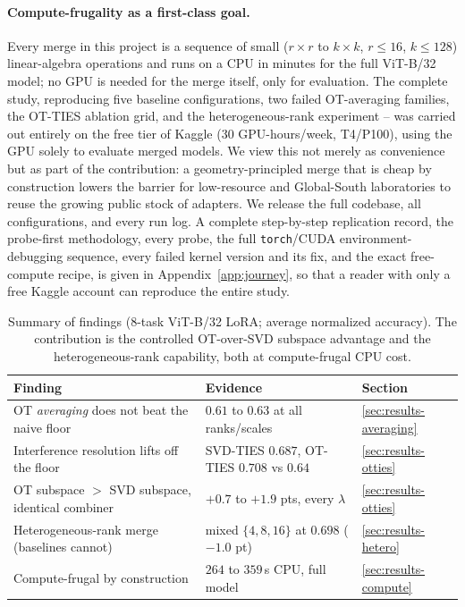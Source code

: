 \documentclass[11pt]{article}
\newcommand{\otties}{\textsc{OT-TIES}}
\newcommand{\svdties}{\textsc{SVD-TIES}}
\begin{document}
\paragraph{Compute-frugality as a first-class goal.}
Every merge in this project is a sequence of small ($r\times r$ to $k\times k$, $r\le 16$, $k\le 128$)
linear-algebra operations and runs on a CPU in minutes for the full ViT-B/32 model; no GPU is needed for
the merge itself, only for evaluation. The complete study, reproducing five baseline configurations,
two failed OT-averaging families, the \otties{} ablation grid, and the heterogeneous-rank experiment --
was carried out entirely on the free tier of Kaggle (30 GPU-hours/week, T4/P100), using the GPU solely to
evaluate merged models. We view this not merely as convenience but as part of the contribution: a
geometry-principled merge that is cheap by construction lowers the barrier for low-resource and
Global-South laboratories to reuse the growing public stock of adapters. We release the full codebase,
all configurations, and every run log. A complete step-by-step replication record, the probe-first
methodology, every probe, the full \texttt{torch}/CUDA environment-debugging sequence, every failed kernel
version and its fix, and the exact free-compute recipe, is given in Appendix~\ref{app:journey}, so that a
reader with only a free Kaggle account can reproduce the entire study.

\begin{table}[t]
\centering
\caption{Summary of findings (8-task ViT-B/32 LoRA; average normalized accuracy). The contribution is
the controlled OT-over-SVD subspace advantage and the heterogeneous-rank capability, both at
compute-frugal CPU cost.}
\label{tab:summary}
\small
\begin{tabular}{lll}
\toprule
Finding & Evidence & Section \\
\midrule
OT \emph{averaging} does not beat the naive floor & $0.61$ to $0.63$ at all ranks/scales & \ref{sec:results-averaging} \\
Interference resolution lifts off the floor & \svdties{} $0.687$, \otties{} $0.708$ vs $0.64$ & \ref{sec:results-otties} \\
OT subspace $>$ SVD subspace, identical combiner & $+0.7$ to $+1.9$ pts, every $\lambda$ & \ref{sec:results-otties} \\
Heterogeneous-rank merge (baselines cannot) & mixed $\{4,8,16\}$ at $0.698$ ($-1.0$ pt) & \ref{sec:results-hetero} \\
Compute-frugal by construction & $264$ to $359$\,s CPU, full model & \ref{sec:results-compute} \\
\bottomrule
\end{tabular}
\end{table}
\end{document}
